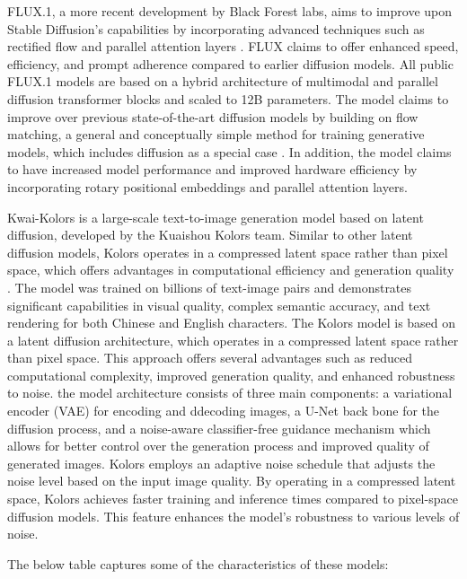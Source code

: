 \documentclass{article}
\begin{document}
FLUX.1, a more recent development by Black Forest labs, aims to improve upon Stable Diffusion's capabilities by incorporating 
advanced techniques such as rectified flow and parallel attention layers \cite{flux2024medium}. FLUX claims to offer enhanced speed, efficiency, 
and prompt adherence compared to earlier diffusion models. All public FLUX.1 models are based on a hybrid architecture of multimodal 
and parallel diffusion transformer blocks and scaled to 12B parameters. The model claims to improve over previous state-of-the-art diffusion 
models by building on flow matching, a general and conceptually simple method for training generative models, which includes 
diffusion as a special case \cite{flux2024main}. In addition, the model claims to have increased model performance and improved hardware efficiency by 
incorporating rotary positional embeddings and parallel attention layers.

Kwai-Kolors is a large-scale text-to-image generation model based on latent diffusion, developed by the Kuaishou Kolors team. 
Similar to other latent diffusion models, Kolors operates in a compressed latent space rather than pixel space, 
which offers advantages in computational efficiency and generation quality \cite{kolors2024}. The model was trained on billions of text-image 
pairs and demonstrates significant capabilities in visual quality, complex semantic accuracy, and text rendering for both 
Chinese and English characters. The Kolors model is based on a latent diffusion architecture, which operates in a compressed 
latent space rather than pixel space. This approach offers several advantages such as reduced computational complexity, improved 
generation quality, and enhanced robustness to noise. the model architecture consists of three main components: a variational encoder 
(VAE) for encoding and ddecoding images, a U-Net back bone for the diffusion process, and a noise-aware classifier-free guidance 
mechanism which allows for better control over the generation process and improved quality of generated images. Kolors employs an 
adaptive noise schedule that adjusts the noise level based on the input image quality. By operating in a compressed latent space, 
Kolors achieves faster training and inference times compared to pixel-space diffusion models. This feature enhances the model's robustness 
to various levels of noise.

The below table captures some of the characteristics of these models:
\end{document}
